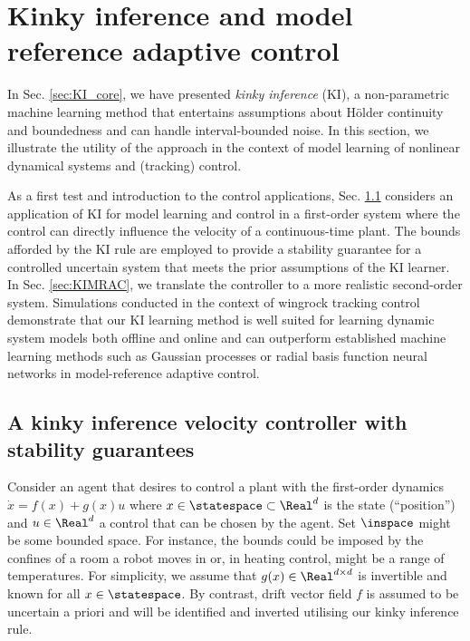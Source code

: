\section{Kinky inference and model reference adaptive control}
\label{sec:hfeandcontrol}
\label{sec:ctrlapplications}
In Sec. \ref{sec:KI_core}, we have presented \textit{kinky inference} (KI),  a non-parametric machine learning method that entertains assumptions about H\"older continuity and boundedness and can handle interval-bounded noise. In this section, we illustrate the utility of the approach in the context of model learning of nonlinear dynamical systems and (tracking) control.

As a first test and introduction to the control applications, Sec. \ref{sec:firstorderctrlandKI} considers an application of KI for model learning and control in a first-order system where the control can directly influence the velocity of a continuous-time plant. The bounds afforded by the KI rule are employed to provide a stability guarantee for a controlled uncertain system that meets the prior assumptions of the KI learner. 
In Sec. \ref{sec:KIMRAC}, we translate the controller to a more realistic second-order system. 
Simulations conducted in the context of wingrock tracking control demonstrate that our KI learning method is well suited for learning dynamic system models both offline and online and can outperform established machine learning methods such as Gaussian processes or radial basis function neural networks in model-reference adaptive control. 


   

\subsection{A kinky inference velocity controller with stability guarantees }
\label{sec:firstorderctrlandKI}
Consider an agent that desires to control a plant with the first-order dynamics 
$\dot x = f(x) + g(x) u $
where $x \in \statespace \subset \Real^d$ is the state (``position'') and $u \in \Real^d$ a control that can be chosen by the agent. Set $\inspace$ might be some bounded space. For instance, the bounds could be imposed by the confines of a room a robot moves in or, in heating control, might be a range of temperatures. 
For simplicity, we assume that $g(x) \in \Real^{d \times d}$ is invertible and known for all $x \in \statespace$. By contrast, drift vector field $f$ is assumed to be uncertain a priori and will be identified and inverted utilising our kinky inference rule.


